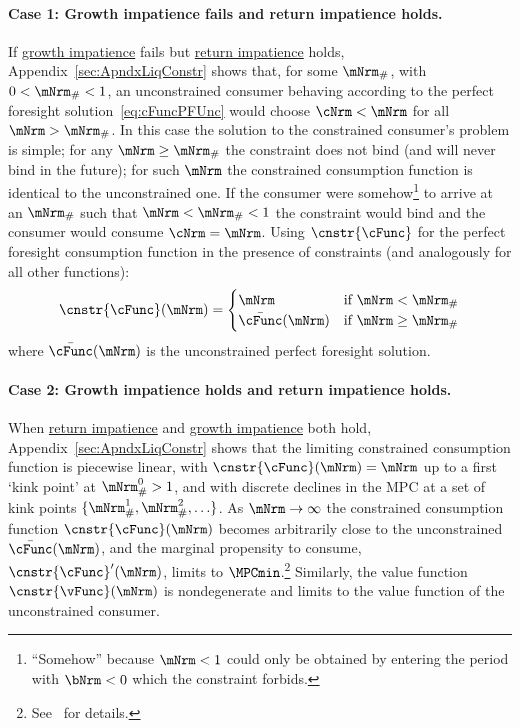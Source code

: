 \documentclass[BufferStockTheory]{subfiles}
\begin{document}
\paragraph{Case 1: Growth impatience fails and return impatience holds.} If \hyperlink{GICRaw}{growth impatience} fails but \hyperlink{RIC}{return impatience} holds, Appendix~\ref{sec:ApndxLiqConstr} shows that, for some $\mNrm_{\#}$, with $0 < \mNrm_{\#} < 1$, an unconstrained consumer behaving according to the perfect foresight solution~\eqref{eq:cFuncPFUnc} would choose $\cNrm < \mNrm$ for all $\mNrm > \mNrm_{\#}$.  In this case the solution to the constrained consumer's problem is simple; for any $\mNrm \geq \mNrm_{\#}$ the constraint does not bind (and will never bind in the future); for such $\mNrm$ the constrained consumption function is identical to the unconstrained one.  If the consumer were somehow\footnote{``Somehow'' because $\mNrm<1$ could only be obtained by entering the period with $\bNrm < 0$ which the constraint forbids.} to arrive at an $\mNrm_{\#}$ such that $\mNrm < \mNrm_{\#} < 1$ the constraint would bind and the consumer would consume $\cNrm=\mNrm$.  Using $\cnstr{\cFunc}$ for the perfect foresight consumption function in the presence of constraints  (and analogously for all other functions):
\begin{equation*}
  \cnstr{\cFunc}(\mNrm)=
  \begin{cases}
    \mNrm & \text{if $\mNrm < \mNrm_{\#}$} \\
    \bar{\cFunc}(\mNrm)  & \text{if $\mNrm \geq \mNrm_{\#}$}
  \end{cases}
\end{equation*}
where $\bar{\cFunc}(\mNrm)$ is the unconstrained perfect foresight solution. 

\paragraph{Case 2: Growth impatience holds and return impatience holds.}  When  \hyperlink{RIC}{return impatience} and  \hyperlink{GICRaw}{growth impatience} both hold, Appendix~\ref{sec:ApndxLiqConstr} shows that the limiting constrained consumption function is piecewise linear, with $\cnstr{\cFunc}(\mNrm)=\mNrm$ up to a first `kink point' at $\mNrm_{\#}^{0}>1$, and with discrete declines in the MPC at a set of kink points $\{\mNrm_{\#}^{1},\mNrm_{\#}^{2},\ldots\}$.  As $\mNrm \rightarrow \infty$ the constrained consumption function $\cnstr{\cFunc}(\mNrm)$ becomes arbitrarily close to the unconstrained $\bar{\cFunc}(\mNrm)$, and the marginal propensity to consume, $\cnstr{\cFunc}^{\prime}(\mNrm)$, limits to $\MPCmin$.\footnote{See~\cite{chkLiqConstr} for details.}  Similarly, the value function $\cnstr{\vFunc}(\mNrm)$ is nondegenerate and limits to the value function of the unconstrained consumer.
\end{document}
